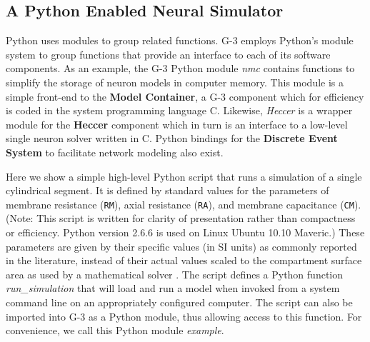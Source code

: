 \documentclass[10pt]{article}
\begin{document}
\subsection*{A Python Enabled Neural Simulator}
\label{ss-apens}

Python uses modules to group related functions.  G-3 employs Python's
module system to group functions that provide an interface to each of
its software components.
As an example, the G-3 Python module {\it nmc} contains functions to
simplify the storage of neuron models in computer memory.  This module
is a simple front-end to the {\bf Model Container}, a G-3 component
which for efficiency is coded in the system programming language C.
Likewise, {\it Heccer} is a wrapper module for the {\bf Heccer}
component which in turn is an interface to a low-level single neuron
solver written in C.  Python bindings for the {\bf Discrete Event System} to facilitate network modeling also exist.

Here we show a simple high-level Python script that runs a simulation of a single cylindrical segment. It
is defined by standard values for the parameters of membrane
resistance ({\tt RM}), axial resistance ({\tt RA}), and membrane
capacitance ({\tt CM}). (Note: This script
  is written for clarity of presentation rather than compactness or
  efficiency. Python version 2.6.6 is used on Linux Ubuntu 10.10
  Maveric.)
These parameters are given by their specific values (in SI units) as
commonly reported in the literature, instead of their actual values
scaled to the compartment surface area as used by a mathematical
solver \cite{cornelis04:_neuros_param_handl}. The script defines a
Python function {\it run\_simulation} that will load and run a model when invoked from
a system command line on an appropriately configured computer.  The script
can also be imported into G-3 as a Python module, thus allowing access
to this function.  For convenience, we call this Python module {\it
  example}.
\end{document}
